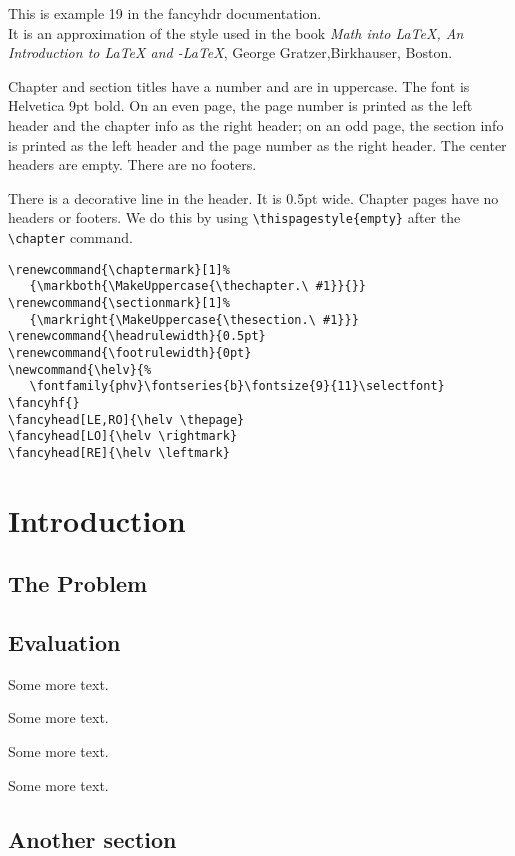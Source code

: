 \documentclass[openany]{book}
\renewcommand{\chaptermark}[1]%
   {\markboth{\MakeUppercase{\thechapter.\ #1}}{}}
\renewcommand{\sectionmark}[1]%
   {\markright{\MakeUppercase{\thesection.\ #1}}}
\renewcommand{\headrulewidth}{0.5pt}
\renewcommand{\footrulewidth}{0pt}
\newcommand{\helv}{%
   \fontfamily{phv}\fontseries{b}\fontsize{9}{11}\selectfont}
\def\ams/{\protect\pAmS}
\def\pAmS{{\the\textfont2
        A\kern-.1667em\lower.5ex\hbox{M}\kern-.125emS}}
\def\amslatex/{\ams/-\LaTeX}
\begin{document}
\tableofcontents

\bigskip

\begin{boxedminipage}{\textwidth}
This is example 19 in the fancyhdr documentation.\\
It is an approximation of the style used in the book 
\textit{Math into LaTeX, An Introduction to \LaTeX{} and \amslatex/}, George Gratzer,Birkhauser, Boston.

Chapter and section titles have a number and are in uppercase. The font is Helvetica 9pt bold.
On an even page, the page number is printed as the left header and
the chapter info as the right header; on an odd page, the section info
is printed as the left header and the page number as the right header.  The
center headers are empty.  There are no footers.

There is a decorative line in the header.  It is 0.5pt wide.
Chapter pages have no headers or footers. We do this by using \verb|\thispagestyle{empty}| after the \verb|\chapter| command.

\begin{verbatim}
\renewcommand{\chaptermark}[1]%
   {\markboth{\MakeUppercase{\thechapter.\ #1}}{}}
\renewcommand{\sectionmark}[1]%
   {\markright{\MakeUppercase{\thesection.\ #1}}}
\renewcommand{\headrulewidth}{0.5pt}
\renewcommand{\footrulewidth}{0pt}
\newcommand{\helv}{%
   \fontfamily{phv}\fontseries{b}\fontsize{9}{11}\selectfont}
\fancyhf{}
\fancyhead[LE,RO]{\helv \thepage}
\fancyhead[LO]{\helv \rightmark}
\fancyhead[RE]{\helv \leftmark}
\end{verbatim}
\end{boxedminipage}

\chapter{Introduction}
\thispagestyle{empty}

\lipsum

\section{The Problem}
\label{sec:problem}

\lipsum[3]

\section{Evaluation}

\lipsum

Some more text.

Some more text.

Some more text.

Some more text.


\section{Another section}

\lipsum[3]
\end{document}
